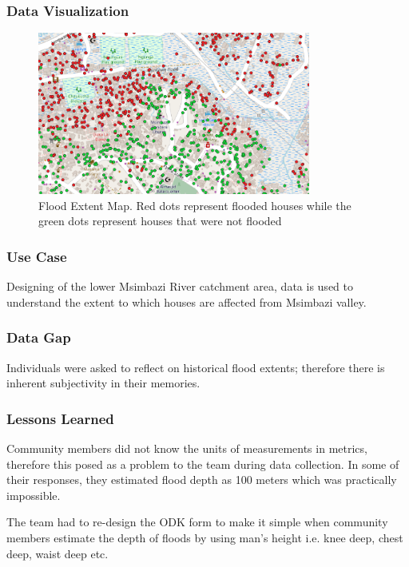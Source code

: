 \documentclass[a4paper,12pt,twoside]{article}
\begin{document}
\subsubsection{Data Visualization}
\begin{figure}[h]
  \color{RHgreen}\caption{Flood Extent Map. Red dots represent flooded houses while the green dots represent houses that were not flooded}
  \centering
 \includegraphics[width=0.8\textwidth]{images/Flood_Extent_Visualization.PNG}
\end{figure}

\subsubsection{Use Case}
Designing of the lower Msimbazi River catchment area, data is used to understand the extent to which houses are affected from Msimbazi valley.

\subsubsection{Data Gap}
Individuals were asked to reflect on historical flood extents; therefore there is inherent subjectivity in their memories.

\subsubsection{Lessons Learned}
Community members did not know the units of measurements in metrics, therefore this posed as a problem to the team during data collection. In some of their responses, they estimated flood depth as 100 meters which was practically impossible.

The team had to re-design the ODK form to make it simple when community members estimate the depth of floods by using man’s height i.e. knee deep, chest deep, waist deep etc.
\end{document}
